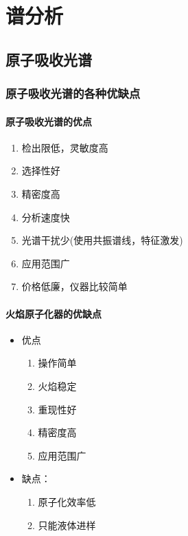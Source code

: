 \documentclass[UTF8,AutoFakeBold,b5paper]{ctexbook}
\begin{document}
\chapter{谱分析}
\section{原子吸收光谱}
\subsection{原子吸收光谱的各种优缺点}
\subsubsection{原子吸收光谱的优点}
\begin{enumerate}
	\item \textcolor[rgb]{0.54,0.13,0.33}{ 检出限低，灵敏度高}
	\item \textcolor[rgb]{0.54,0.13,0.33}{选择性好}
	\item \textcolor[rgb]{0.54,0.13,0.33}{精密度高}
	\item \textcolor[rgb]{0.54,0.13,0.33}{分析速度快}
	\item 光谱干扰少(使用共振谱线，特征激发)
	\item 应用范围广
	\item 价格低廉，仪器比较简单
\end{enumerate}
\subsubsection{火焰原子化器的优缺点}
\begin{itemize}
	\item 优点\begin{enumerate}
		\item \textcolor[rgb]{0.54,0.13,0.33}{操作简单}
		\item \textcolor[rgb]{0.54,0.13,0.33}{火焰稳定}
		\item \textcolor[rgb]{0.54,0.13,0.33}{重现性好}
		\item \textcolor[rgb]{0.54,0.13,0.33}{精密度高}
		\item 应用范围广
	\end{enumerate}
	\item 缺点：\begin{enumerate}
		\item 原子化效率低
		\item 只能液体进样
	\end{enumerate}
\end{itemize}
\end{document}
